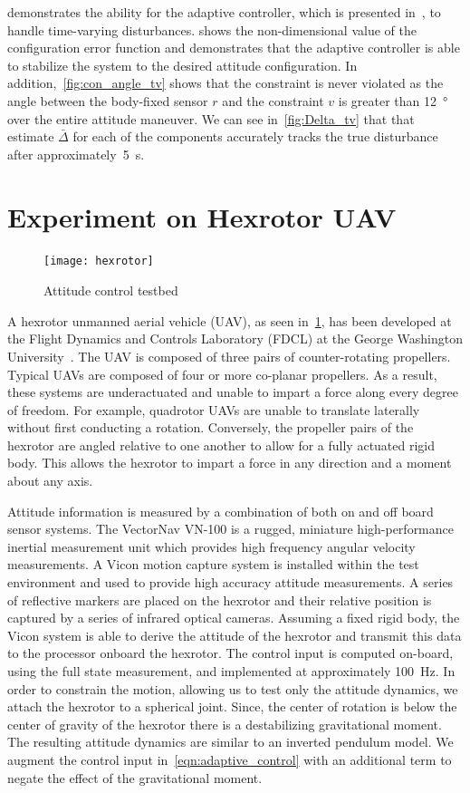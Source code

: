 \documentclass[10pt,fleqn]{IJCAS}  %
\begin{document}
\begin{multicols}{2}
 demonstrates the ability for the adaptive controller, which is presented in~, to handle time-varying disturbances.
 shows the non-dimensional value of the configuration error function and demonstrates that the adaptive controller is able to stabilize the system to the desired attitude configuration.
In addition,~\cref{fig:con_angle_tv} shows that the constraint is never violated as the angle between the body-fixed sensor \( r \) and the constraint \( v \) is greater than \SI{12}{\degree} over the entire attitude maneuver.
We can see in~\cref{fig:Delta_tv} that that estimate \(\bar \Delta \) for each of the components accurately tracks the true disturbance after approximately~\SI{5}{\second}.

\section{Experiment on Hexrotor UAV}\label{sec:experiment}
\begin{figure}[H]
    \centering
    \texttt{[image: hexrotor]}
    \caption{Attitude control testbed~\label{fig:hexrotor}}
\end{figure}
A hexrotor unmanned aerial vehicle (UAV), as seen in~\cref{fig:hexrotor}, has been developed at the Flight Dynamics and Controls Laboratory (FDCL) at the George Washington University~\cite{kaufman2014}.
The UAV is composed of three pairs of counter-rotating propellers. 
Typical UAVs are composed of four or more co-planar propellers.
As a result, these systems are underactuated and unable to impart a force along every degree of freedom.
For example, quadrotor UAVs are unable to translate laterally without first conducting a rotation.
Conversely, the propeller pairs of the hexrotor are angled relative to one another to allow for a fully actuated rigid body.
This allows the hexrotor to impart a force in any direction and a moment about any axis. 

Attitude information is measured by a combination of both on and off board sensor systems.
The VectorNav VN-100 is a rugged, miniature high-performance inertial measurement unit which provides high frequency angular velocity measurements.
A Vicon motion capture system is installed within the test environment and used to provide high accuracy attitude measurements. 
A series of reflective markers are placed on the hexrotor and their relative position is captured by a series of infrared optical cameras. 
Assuming a fixed rigid body, the Vicon system is able to derive the attitude of the hexrotor and transmit this data to the processor onboard the hexrotor.
The control input is computed on-board, using the full state measurement, and implemented at approximately \SI{100}{\hertz}.
In order to constrain the motion, allowing us to test only the attitude dynamics, we attach the hexrotor to a spherical joint.
Since, the center of rotation is below the center of gravity of the hexrotor there is a destabilizing gravitational moment.
The resulting attitude dynamics are similar to an inverted pendulum model.
We augment the control input in~\cref{eqn:adaptive_control} with an additional term to negate the effect of the gravitational moment.


\end{multicols}
\end{document}
